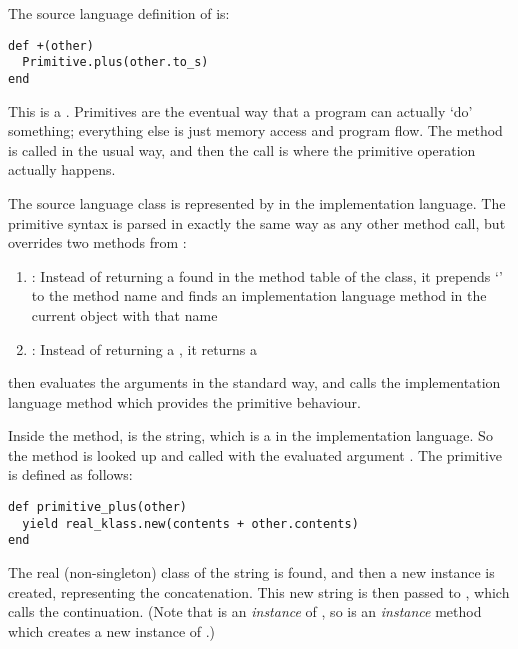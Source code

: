 The source language definition of  is:

\begin{lstlisting}
def +(other)
  Primitive.plus(other.to_s)
end
\end{lstlisting}

This is a . Primitives are the eventual way that a program can actually `do' something; everything else is just memory access and program flow. The \code{+} method is called in the usual way, and then the  call is where the primitive operation actually happens.

The source language  class is represented by  in the implementation language. The primitive syntax is parsed in exactly the same way as any other method call, but \- overrides two methods from :

\begin{enumerate}
  \item \textbf{}: Instead of returning a  found in the method table of the class, it prepends `' to the method name and finds an implementation language method in the current  object with that name
  
  \item \textbf{}: Instead of returning a , it returns a 
\end{enumerate}

 then evaluates the arguments in the standard way, and calls the implementation language method which provides the primitive behaviour.

Inside the \code{+} method,  is the  string, which is a  in the implementation language. So the  method is looked up and called with the evaluated argument . The primitive is defined as follows:

\begin{lstlisting}
def primitive_plus(other)
  yield real_klass.new(contents + other.contents)
end
\end{lstlisting}

The real (non-singleton) class of the string is found, and then a new instance is created, representing the concatenation. This new string is then passed to , which calls the continuation. (Note that  is an \textit{instance} of , so  is an \textit{instance} method which creates a new instance of .)

